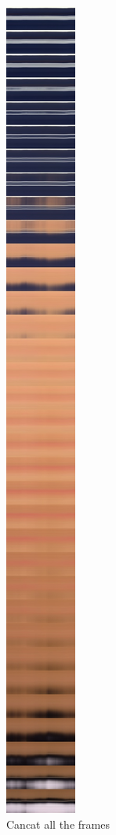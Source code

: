 \begin{figure}[!h]
\begin{subfigure}{.5\textwidth}
  \includegraphics[scale=0.1]{img/eulerian/sample/ress}
  \caption{Cancat all the frames}
  \label{fig:sub2}
\end{subfigure}
\begin{subfigure}{.45\textwidth}

\end{subfigure}
\end{figure}
